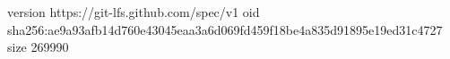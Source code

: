 version https://git-lfs.github.com/spec/v1
oid sha256:ae9a93afb14d760e43045eaa3a6d069fd459f18be4a835d91895e19ed31c4727
size 269990

